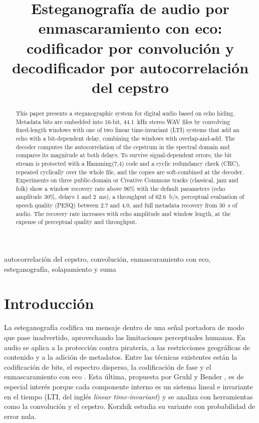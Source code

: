 \documentclass[journal]{IEEEtran}
\begin{document}
\title{Esteganografía de audio por enmascaramiento con eco: codificador por convolución y decodificador por autocorrelación del cepstro}
\author{
}
\maketitle

\begin{abstract}
This paper presents a steganographic system for digital audio based on echo hiding. Metadata bits are embedded into 16-bit, 44.1~kHz stereo WAV files by convolving fixed-length windows with one of two linear time-invariant (LTI) systems that add an echo with a bit-dependent delay, combining the windows with overlap-and-add. The decoder computes the autocorrelation of the cepstrum in the spectral domain and compares its magnitude at both delays. To survive signal-dependent errors, the bit stream is protected with a Hamming(7,4) code and a cyclic redundancy check (CRC), repeated cyclically over the whole file, and the copies are soft-combined at the decoder. Experiments on three public-domain or Creative Commons tracks (classical, jazz and folk) show a window recovery rate above 96\% with the default parameters (echo amplitude 30\%, delays 1 and 2~ms), a throughput of 62.6~b/s, perceptual evaluation of speech quality (PESQ) between 2.7 and 4.0, and full metadata recovery from 30~s of audio. The recovery rate increases with echo amplitude and window length, at the expense of perceptual quality and throughput.
\end{abstract}

\begin{IEEEkeywords}
autocorrelación del cepstro, convolución, enmascaramiento con eco, esteganografía, solapamiento y suma
\end{IEEEkeywords}

\section{Introducción}
La esteganografía codifica un mensaje dentro de una señal portadora de modo que pase inadvertido, aprovechando las limitaciones perceptuales humanas. En audio se aplica a la protección contra piratería, a las restricciones geográficas de contenido y a la adición de metadatos. Entre las técnicas existentes están la codificación de bits, el espectro disperso, la codificación de fase y el enmascaramiento con eco \cite{kim,behal}. Esta última, propuesta por Gruhl y Bender \cite{gruhl}, es de especial interés porque cada componente interno es un sistema lineal e invariante en el tiempo (LTI, del inglés \textit{linear time-invariant}) y se analiza con herramientas como la convolución y el cepstro. Korzhik \cite{korzhik} estudia su variante con probabilidad de error nula.
\end{document}
